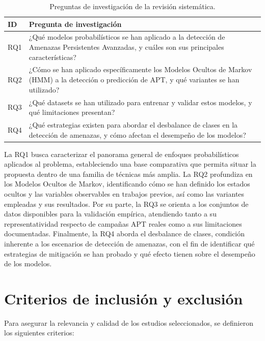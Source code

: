 \begin{table}[h!]
\centering
\small
\caption{Preguntas de investigación de la revisión sistemática.}
\label{tab:rqs}
\begin{tabular}{p{1.2cm} p{14.4cm}}
\hline
\textbf{ID} & \textbf{Pregunta de investigación} \\
\hline
RQ1 & ¿Qué modelos probabilísticos se han aplicado a la detección de Amenazas Persistentes Avanzadas, y cuáles son sus principales características? \\
RQ2 & ¿Cómo se han aplicado específicamente los Modelos Ocultos de Markov (HMM) a la detección o predicción de APT, y qué variantes se han utilizado? \\
RQ3 & ¿Qué datasets se han utilizado para entrenar y validar estos modelos, y qué limitaciones presentan? \\
RQ4 & ¿Qué estrategias existen para abordar el desbalance de clases en la detección de amenazas, y cómo afectan el desempeño de los modelos? \\
\hline
\end{tabular}
\end{table}
\FloatBarrier

La RQ1 busca caracterizar el panorama general de enfoques probabilísticos aplicados al problema, estableciendo una base comparativa que permita situar la propuesta dentro de una familia de técnicas más amplia. La RQ2 profundiza en los Modelos Ocultos de Markov, identificando cómo se han definido los estados ocultos y las variables observables en trabajos previos, así como las variantes empleadas y sus resultados. Por su parte, la RQ3 se orienta a los conjuntos de datos disponibles para la validación empírica, atendiendo tanto a su representatividad respecto de campañas APT reales como a sus limitaciones documentadas. Finalmente, la RQ4 aborda el desbalance de clases, condición inherente a los escenarios de detección de amenazas, con el fin de identificar qué estrategias de mitigación se han probado y qué efecto tienen sobre el desempeño de los modelos.

\section{Criterios de inclusión y exclusión}

Para asegurar la relevancia y calidad de los estudios seleccionados, se definieron los siguientes criterios:

